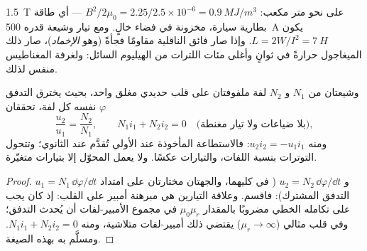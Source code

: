 \begin{example}\label{ex:b1:induction:mri}
\qty{1.5}{T} على نحو متر مكعب: $B^2/2\mu_0 = 2.25/2.5 \times 10^{-6} =
\qty{0.9}{MJ/m^3}$ --- أي طاقة بطارية سيارة، مخزونة في فضاء خالٍ.
ومع تيار وشيعة قدره \qty{500}{A} يكون $L = 2W/I^2 = \qty{7}{H}$. وإذا
صار فائق الناقلية مقاومًا فجأةً (وهو \emph{الإخماد})، صار ذلك الميغاجول
حرارةً في ثوانٍ وأغلى مئات اللترات من الهيليوم
السائل: ولغرفة المغناطيس منفس لذلك.
\end{example}

\begin{proposition}\label{prop:b1:induction:transformer}
وشيعتان من $N_1$ و $N_2$ لفة ملفوفتان على قلب حديدي مغلق واحد،
بحيث يخترق التدفق $\varphi$ نفسه كل لفة، تحققان
\[
\frac{u_2}{u_1} = \frac{N_2}{N_1} , \qquad N_1i_1 + N_2i_2 = 0 \quad\text{(بلا ضياعات ولا تيار مغنطة)},
\]
ومنه $u_2i_2 = -u_1i_1$: فالاستطاعة المأخوذة عند الأولي تُقدَّم
عند الثانوي؛ وتتحول التوترات بنسبة اللفات، والتيارات
عكسًا. ولا يعمل المحوّل إلا بتيارات متغيّرة.
\end{proposition}

\begin{proof}
$u_1 = N_1\,\dd\varphi/\dd t$ و $u_2 = N_2\,\dd\varphi/\dd t$ (
في كليهما، والجهتان مختارتان على امتداد التدفق المشترك): فاقسم.
وعلاقة التيارين هي مبرهنة أمبير على القلب: إذ كان يجب على تكامله الخطي
مضروبًا بالمقدار $\mu_0\mu_r$ في مجموع الأمبير-لفات أن يُحدث
التدفق؛ وفي قلب مثالي ($\mu_r \to \infty$) يقتضي ذلك أمبير-لفات
متلاشية، ومنه $N_1i_1 + N_2i_2 = 0$. ومسلَّم به بهذه الصيغة.
\end{proof}

